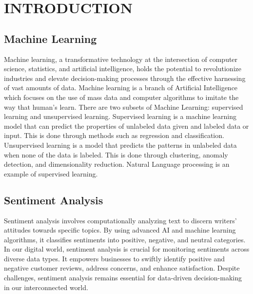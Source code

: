 \documentclass[letterpaper, 12 pt, conference]{ieeeconf}
\begin{document}


\section{INTRODUCTION}

\subsection{Machine Learning}


Machine learning, a transformative technology at the intersection of computer science, statistics, and artificial intelligence, holds the potential to revolutionize industries and elevate decision-making processes through the effective harnessing of vast amounts of data. Machine learning is a branch of Artificial Intelligence which focuses on the use of mass data and computer algorithms to imitate the way that human's learn. There are two subsets of Machine Learning: supervised learning and unsupervised learning. Supervised learning is a machine learning model that can predict the properties of unlabeled data given and labeled data or input. This is done through methods such as regression and classification. Unsupervised learning is a model that predicts the patterns in unlabeled data when none of the data is labeled. This is done through clustering, anomaly detection, and dimensionality reduction. Natural Language processing is an example of supervised learning. 

\subsection{Sentiment Analysis} 
Sentiment analysis involves computationally analyzing text to discern writers' attitudes towards specific topics. By using advanced AI and machine learning algorithms, it classifies sentiments into positive, negative, and neutral categories. In our digital world, sentiment analysis is crucial for monitoring sentiments across diverse data types. It empowers businesses to swiftly identify positive and negative customer reviews, address concerns, and enhance satisfaction. Despite challenges, sentiment analysis remains essential for data-driven decision-making in our interconnected world.
\end{document}
